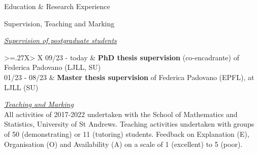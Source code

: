 \documentclass{resume} %
\begin{document}
\begin{rSection}{Education \& Research Experience}
\end{rSection}


\begin{rSection}{Supervision, Teaching and Marking}

\underline{\em Supervision of postgraduate students} \\[3pt]
\noindent
\renewcommand{\arraystretch}{1}
\begin{tabularx}{\linewidth}{>{\hsize=.27\hsize}X> {\hsize}X}
{09/23 - today} & {{\bf PhD thesis supervision} (co-encadrante) of Federica Padovano (LJLL, SU)}\\
{01/23 - 08/23} & {{\bf Master thesis supervision} of Federica Padovano (EPFL), at LJLL (SU)}\\
\end{tabularx} 

\underline{\em Teaching and Marking} \\[3pt]
All activities of 2017-2022 undertaken with the School of Mathematics and Statistics, University of St Andrews. 
Teaching activities undertaken with groups of 50 (demonstrating) or 11 (tutoring) students. 
Feedback on Explanation (E), Organisation (O) and Availability (A) on a scale of 1 (excellent) to 5 (poor).


\end{rSection}
\end{document}
